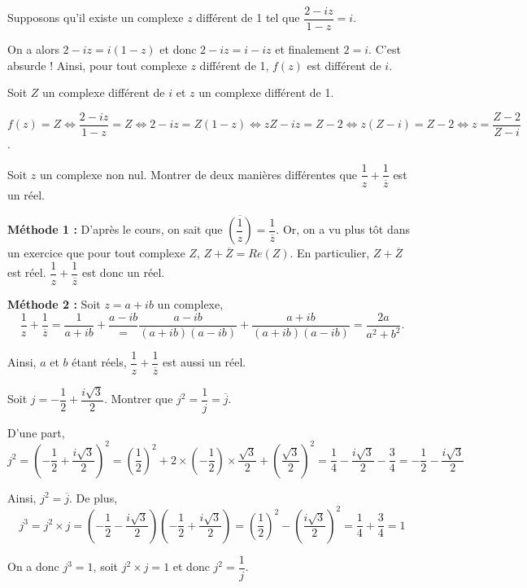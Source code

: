 \documentclass[11pt,fleqn, openany]{book} %
\begin{document}
\begin{solution}Supposons qu'il existe un complexe \(z\) différent de 1 tel que \(\dfrac{2-iz}{1-z}=i\). 

On a alors \(2-iz=i(1-z)\) et donc \(2-iz=i-iz\) et finalement \(2=i\). C'est absurde ! Ainsi, pour tout complexe \(z\) différent de 1, \(f(z)\) est différent de \(i\).

Soit \(Z\) un complexe différent de \(i\) et \(z\) un complexe différent de 1.

\(f(z)=Z \Leftrightarrow \dfrac{2-iz}{1-z}=Z \Leftrightarrow 2-iz = Z(1-z) \Leftrightarrow zZ-iz = Z - 2 \Leftrightarrow z(Z-i)=Z-2 \Leftrightarrow z = \dfrac{Z-2}{Z-i}\).\end{solution}


\begin{exercise}[topic=cpx03]Soit $z$ un complexe non nul. Montrer de deux manières différentes que $\dfrac{1}{z}+\dfrac{1}{\overline{z}}$ est un réel.\newpage \end{exercise}

\begin{solution}

\textbf{Méthode 1 :} D'après le cours, on sait que \(\overline{\left(\dfrac{1}{z}\right)} = \dfrac{1}{\overline{z}} \). Or, on a vu plus tôt dans un exercice que pour tout complexe \(Z\), \(Z+\overline{Z}=Re(Z)\). En particulier, \(Z+\overline{Z}\) est réel. \(\dfrac{1}{z}+\dfrac{1}{\overline{z}}\) est donc un réel.

\textbf{Méthode 2 :} Soit \(z=a+ib\) un complexe,
\[\dfrac{1}{z}+\dfrac{1}{\overline{z}} = \dfrac{1}{a+ib}+\dfrac{a-ib}=\dfrac{a-ib}{(a+ib)(a-ib)}+\dfrac{a+ib}{(a+ib)(a-ib)}=\dfrac{2a}{a^2+b^2}.\]

Ainsi, \(a\) et \(b\) étant réels, \(\dfrac{1}{z}+\dfrac{1}{\overline{z}}\) est aussi un réel.\end{solution}


\begin{exercise}[topic=cpx03]Soit $j=-\dfrac{1}{2}+\dfrac{i\sqrt{3}}{2}$. Montrer que $j^2=\dfrac{1}{j}=\overline{j}$.\end{exercise}

\begin{solution}D'une part,
\[j^2=\left(-\dfrac{1}{2}+\dfrac{i\sqrt{3}}{2}\right)^2=\left(\dfrac{1}{2}\right)^2+2\times \left(-\dfrac{1}{2}\right) \times \dfrac{\sqrt{3}}{2} + \left(\dfrac{\sqrt{3}}{2}\right)^2=\dfrac{1}{4}-\dfrac{i\sqrt{3}}{2}-\dfrac{3}{4}=-\dfrac{1}{2}-\dfrac{i\sqrt{3}}{2}\]

Ainsi, \(j^2=\overline{j}\). De plus, 
\[j^3 = j^2 \times j = \left(-\dfrac{1}{2}-\dfrac{i\sqrt{3}}{2}\right) \left(-\dfrac{1}{2}+\dfrac{i\sqrt{3}}{2}\right)=\left(\dfrac{1}{2}\right)^2-\left(\dfrac{i\sqrt{3}}{2}\right)^2=\dfrac{1}{4}+\dfrac{3}{4}=1\]

On a donc \(j^3=1\), soit \(j^2 \times j =1\) et donc \(j^2 = \dfrac{1}{j}\).\end{solution}
\end{document}
